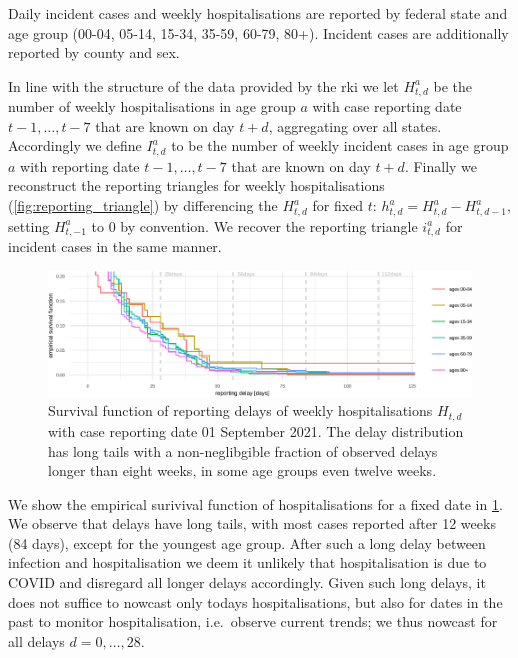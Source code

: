 Daily incident cases and weekly hospitalisations are reported by federal
state and age group (00-04, 05-14, 15-34, 35-59, 60-79, 80+). Incident
cases are additionally reported by county and sex.

In line with the structure of the data provided by the \gls{rki} we let \(H^a_{t,d}\) be the number of weekly hospitalisations
in age group \(a\) with case reporting date \(t - 1, \dots, t - 7\) that
are known on day \(t + d\), aggregating over all states. Accordingly we
define \(I^a_{t,d}\) to be the number of weekly incident cases in age
group \(a\) with reporting date \(t - 1, \dots, t - 7\) that are known
on day \(t + d\). Finally we reconstruct the reporting triangles for
weekly hospitalisations (\cref{fig:reporting_triangle}) by
differencing the \(H^a_{t,d}\) for fixed \(t\):
\(h^a_{t,d} = H^a_{t,d} - H^a_{t, d - 1}\), setting \(H^a_{t, -1}\) to
\(0\) by convention. We recover the reporting triangle \(i^a_{t,d}\) for
incident cases in the same manner.

\begin{figure}

    {\centering \includegraphics[width=\textwidth]{figures_tentative/delay_tails-1} 

}

\caption{Survival function of reporting delays of weekly hospitalisations $H_{t,d}$ with case reporting date 01 September 2021. The delay distribution has long tails with a non-neglibgible fraction of observed delays longer than eight weeks, in some age groups even twelve weeks.}\label{fig:delay_tails}
\end{figure}

We show the empirical surivival function of hospitalisations for a fixed
date in \cref{fig:delay_tails}. We observe that delays have long
tails, with most cases reported after 12 weeks (84 days), except for the
youngest age group. After such a long delay between infection and
hospitalisation we deem it unlikely that hospitalisation is due to COVID
and disregard all longer delays accordingly. Given such long delays, it
does not suffice to nowcast only todays hospitalisations, but also for
dates in the past to monitor hospitalisation, i.e.~observe current
trends; we thus nowcast for all delays \(d = 0, \dots, 28\).

